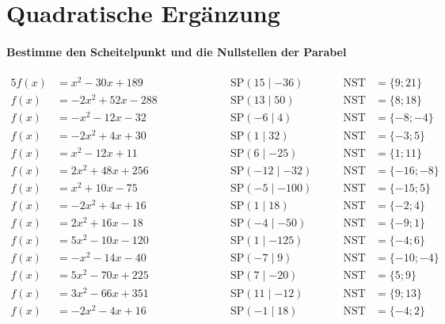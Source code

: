 \documentclass
[
  draft    = true,
  fontsize = 11pt,
  parskip  = half-,
  BCOR     = 0pt,
  DIV      = 11
]
{scrartcl}
\begin{document}

\clearpage
\section*{Quadratische Ergänzung}
\paragraph{Bestimme den Scheitelpunkt und die Nullstellen der Parabel}
\begin{alignat*}{5}
  f(x)&=x^{2}-30x+189 \qquad&\qquad \quad&\text{SP}(15\mid-36) \quad&\quad \text{NST}&=\{9;21\} \\[0.5ex]
  f(x)&=-2x^{2}+52x-288 \qquad&\qquad \quad&\text{SP}(13\mid50) \quad&\quad \text{NST}&=\{8;18\} \\[0.5ex]
  f(x)&=-x^{2}-12x-32 \qquad&\qquad \quad&\text{SP}(-6\mid4) \quad&\quad \text{NST}&=\{-8;-4\} \\[0.5ex]
  f(x)&=-2x^{2}+4x+30 \qquad&\qquad \quad&\text{SP}(1\mid32) \quad&\quad \text{NST}&=\{-3;5\} \\[0.5ex]
  f(x)&=x^{2}-12x+11 \qquad&\qquad \quad&\text{SP}(6\mid-25) \quad&\quad \text{NST}&=\{1;11\} \\[0.5ex]
  f(x)&=2x^{2}+48x+256 \qquad&\qquad \quad&\text{SP}(-12\mid-32) \quad&\quad \text{NST}&=\{-16;-8\} \\[0.5ex]
  f(x)&=x^{2}+10x-75 \qquad&\qquad \quad&\text{SP}(-5\mid-100) \quad&\quad \text{NST}&=\{-15;5\} \\[0.5ex]
  f(x)&=-2x^{2}+4x+16 \qquad&\qquad \quad&\text{SP}(1\mid18) \quad&\quad \text{NST}&=\{-2;4\} \\[0.5ex]
  f(x)&=2x^{2}+16x-18 \qquad&\qquad \quad&\text{SP}(-4\mid-50) \quad&\quad \text{NST}&=\{-9;1\} \\[0.5ex]
  f(x)&=5x^{2}-10x-120 \qquad&\qquad \quad&\text{SP}(1\mid-125) \quad&\quad \text{NST}&=\{-4;6\} \\[0.5ex]
  f(x)&=-x^{2}-14x-40 \qquad&\qquad \quad&\text{SP}(-7\mid9) \quad&\quad \text{NST}&=\{-10;-4\} \\[0.5ex]
  f(x)&=5x^{2}-70x+225 \qquad&\qquad \quad&\text{SP}(7\mid-20) \quad&\quad \text{NST}&=\{5;9\} \\[0.5ex]
  f(x)&=3x^{2}-66x+351 \qquad&\qquad \quad&\text{SP}(11\mid-12) \quad&\quad \text{NST}&=\{9;13\} \\[0.5ex]
  f(x)&=-2x^{2}-4x+16 \qquad&\qquad \quad&\text{SP}(-1\mid18) \quad&\quad \text{NST}&=\{-4;2\} \\[0.5ex]

\end{alignat*}
\end{document}
